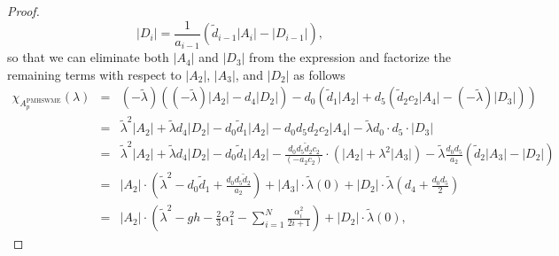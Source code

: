 \documentclass[10pt,a4paper]{amsart}
\begin{document}
\begin{proof}
    \begin{equation*}
        \left|D_{i}\right| = \frac{1}{a_{i-1}}\left( \widetilde{d}_{{i-1}} \left|A_i\right| - \left|D_{i-1}\right| \right),
    \end{equation*}
    so that we can eliminate both $\left|A_4\right|$ and $\left|D_3\right|$ from the expression and factorize the remaining terms with respect to $\left|A_2\right|$, $\left|A_3\right|$, and $\left|D_2\right|$ as follows
    \begin{eqnarray*}
       \chi_{A^{\textrm{PMHSWME}}_{p}}(\lambda) &=&(-\widetilde{\lambda}) \left((-\widetilde{\lambda}) \left|A_2\right|-d_4\left|D_2\right|\right)-d_0  \left(\widetilde{d}_{1}\left|A_2\right|+d_5 \left(\widetilde{d}_2 c_2\left|A_4\right|-(-\widetilde{\lambda}) \left|D_3\right|\right)\right) \\
       &=& \widetilde{\lambda}^2\left|A_2\right|+\widetilde{\lambda} d_4\left|D_2\right|-d_0 \widetilde{d}_{1}\left|A_2\right|-d_0 d_5 d_2 c_2\left|A_4\right|-\widetilde{\lambda} d_0 \cdot d_5 \cdot\left|D_3\right| \\
       &=& \widetilde{\lambda}^2\left|A_2\right|+\widetilde{\lambda} d_4\left|D_2\right|-d_0 \widetilde{d}_{1}\left|A_2\right|-\frac{d_0 d_5 \widetilde{d}_2 c_2}{\left(-a_2 c_2\right)} \cdot\left(\left|A_2\right|+\lambda^2\left|A_3\right|\right)-\widetilde{\lambda} \frac{d_0 d_5}{a_2}\left(\widetilde{d}_2\left|A_3\right|-\left|D_2\right|\right) \\
        &=& \left|A_2\right| \cdot\left(\widetilde{\lambda}^2-d_0 \widetilde{d}_{1}+\frac{d_0 d_5\widetilde{d}_2}{a_2}\right) + |A_3| \cdot \widetilde{\lambda} \left(0\right) +\left|D_2\right| \cdot  \widetilde{\lambda}\left(d_4+\frac{d_0 d_5}{2}\right) \\
        &=& \left|A_2\right| \cdot\left(\widetilde{\lambda}^2 - gh - \frac{2}{3}\alpha_1^2 - \sum\limits_{i=1}^N\frac{\alpha_i^2}{2i+1}\right) +\left|D_2\right| \cdot  \widetilde{\lambda}\left( 0 \right),
    \end{eqnarray*}

\end{proof}
\end{document}
